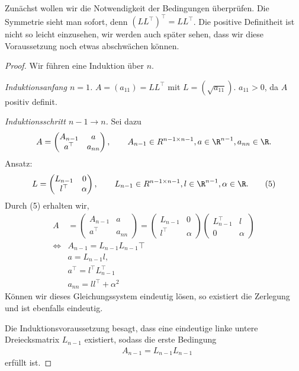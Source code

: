 Zunächst wollen wir die Notwendigkeit der Bedingungen überprüfen. Die Symmetrie
sieht man sofort, denn $(LL^\top)^\top = LL^\top$. Die positive Definitheit ist
nicht so leicht einzusehen, wir werden auch später sehen, dass wir diese
Voraussetzung noch etwas abschwächen können.

\begin{proof}
Wir führen eine Induktion über $n$.

\textit{Induktionsanfang $n=1$.}
$A=(a_{11}) = LL^\top$ mit $L=(\sqrt{a_{11}})$. $a_{11}>0$, da $A$ positiv
definit.

\textit{Induktionsschritt $n-1\to n$.}
Sei dazu
\begin{align*}
A = \begin{pmatrix}
A_{n-1} & a\\
a^\top & a_{nn}
\end{pmatrix},\qquad A_{n-1}\in R^{n-1\times n-1}, a\in\R^{n-1}, a_{nn}\in\R.
\end{align*}
Ansatz:
\begin{align*}
L = \begin{pmatrix}
L_{n-1} & 0\\
l^\top & \alpha
\end{pmatrix},\qquad L_{n-1}\in R^{n-1\times n-1}, l\in\R^{n-1},
\alpha\in\R.\tag{5}
\end{align*}
Durch (5) erhalten wir,
\begin{align*}
A&=\begin{pmatrix}
A_{n-1} & a\\
a^\top & a_{nn}
\end{pmatrix}
= \begin{pmatrix}
L_{n-1} & 0\\
l^\top & \alpha
\end{pmatrix}
\begin{pmatrix}
L_{n-1}^\top & l\\
0 & \alpha
\end{pmatrix}\\
\Leftrightarrow
&A_{n-1} = L_{n-1}L_{n-1}\top\\
&a = L_{n-1}l,\\
&a^\top = l^\top L_{n-1}^\top\\
&a_{nn}  = ll^\top + \alpha^2
\end{align*}
Können wir dieses Gleichungssystem eindeutig lösen, so existiert die Zerlegung
und ist ebenfalls eindeutig.

Die Induktionsvoraussetzung besagt, dass eine eindeutige linke untere
Dreiecksmatrix $L_{n-1}$ existiert, sodass die erste Bedingung
\begin{align*}
&A_{n-1} = L_{n-1}L_{n-1}
\end{align*}
erfüllt ist.


\end{proof}
